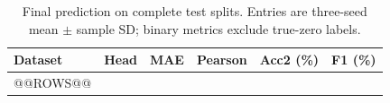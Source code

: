 \begin{table}[!htbp]\centering\small
\caption{Final prediction on complete test splits. Entries are three-seed mean $\pm$ sample SD; binary metrics exclude true-zero labels.}\label{tab:test-prediction}
\begin{tabular}{llcccc}\toprule Dataset & Head & MAE & Pearson & Acc2 (\%) & F1 (\%) \\\midrule
@@ROWS@@
\bottomrule\end{tabular}\end{table}